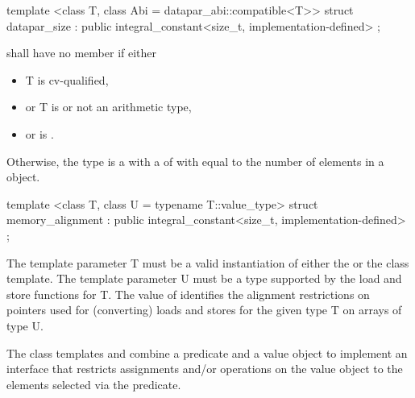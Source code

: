 \begin{itemdecl}
template <class T, class Abi = datapar_abi::compatible<T>>
struct datapar_size : public integral_constant<size_t, implementation-defined> {};
\end{itemdecl}
\begin{itemdescr}
  \pnum\label{datapar_size}%
   shall have no member  if either
  \begin{itemize}
    \item \type T is cv-qualified,
    \item or \type T is \bool or not an arithmetic type,
    \item or  is \false.
  \end{itemize}

  \pnum
  Otherwise, the type  is a \BinaryTypeTrait with a \BaseCharacteristic of  with  equal to the number of elements in a \datapar[<T, Abi>] object.

\end{itemdescr}

\begin{itemdecl}
template <class T, class U = typename T::value_type>
struct memory_alignment : public integral_constant<size_t, implementation-defined> {};
\end{itemdecl}
\begin{itemdescr}
  \pnum\requires The template parameter \type T must be a valid instantiation of either the \datapar or the \mask class template.
  \pnum\requires The template parameter \type U must be a type supported by the load and store functions for \type T.
  \pnum The value of  identifies the alignment restrictions on pointers used for (converting) loads and stores for the given type \type T on arrays of type \type U.
\end{itemdescr}



\pnum The class templates  and  combine a predicate and a value object to implement an interface that restricts assignments and/or operations on the value object to the elements selected via the predicate.

